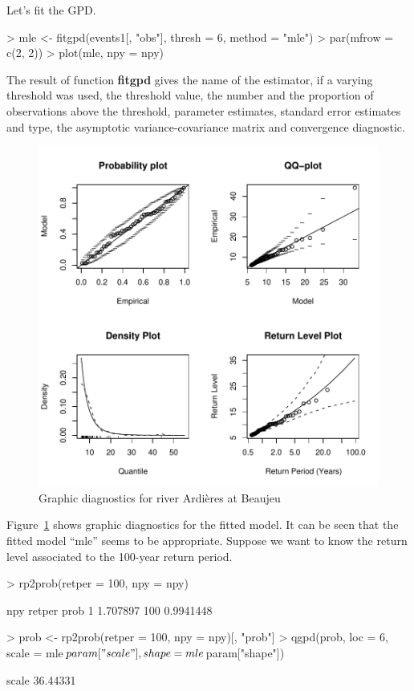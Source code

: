 \documentclass[a4paper]{article}
\numberwithin{equation}{section}
\theoremstyle{definition}
\begin{document}
Let's fit the GPD.
\begin{Schunk}
\begin{Sinput}
> mle <- fitgpd(events1[, "obs"], thresh = 6, method = "mle")
> par(mfrow = c(2, 2))
> plot(mle, npy = npy)
\end{Sinput}
\end{Schunk}

The result of function \textbf{fitgpd} gives the name of the
estimator, if a varying threshold was used, the threshold value, the
number and the proportion of observations above the threshold,
parameter estimates, standard error estimates and type, the asymptotic
variance-covariance matrix and convergence diagnostic.

\begin{figure}
\centering
\includegraphics{guide-041}
\caption{Graphic diagnostics for river Ardi\`eres at Beaujeu}
\label{fig:checkArdieres}
\end{figure}

Figure~\ref{fig:checkArdieres} shows graphic diagnostics for the
fitted model. It can be seen that the fitted model ``mle'' seems to be
appropriate. Suppose we want to know the return level associated to
the 100-year return period.
\begin{Schunk}
\begin{Sinput}
> rp2prob(retper = 100, npy = npy)
\end{Sinput}
\begin{Soutput}
       npy retper      prob
1 1.707897    100 0.9941448
\end{Soutput}
\begin{Sinput}
> prob <- rp2prob(retper = 100, npy = npy)[, "prob"]
> qgpd(prob, loc = 6, scale = mle$param["scale"], shape = mle$param["shape"])
\end{Sinput}
\begin{Soutput}
   scale 
36.44331 
\end{Soutput}
\end{Schunk}
\end{document}
